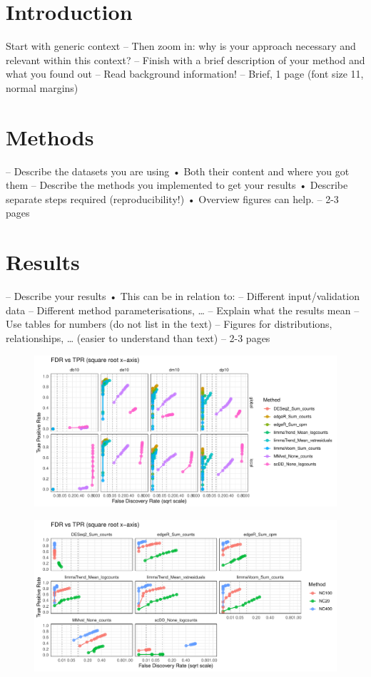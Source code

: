 \documentclass[a4paper, 11pt, twocolumn]{article}
\begin{document}
\twocolumn
\section{Introduction}

Start with generic context
– Then zoom in: why is your approach necessary
and relevant within this context?
– Finish with a brief description of your method and
what you found out
– Read background information!
– Brief, 1 page (font size 11, normal margins)

\section{Methods}
– Describe the datasets you are using
• Both their content and where you got them
– Describe the methods you implemented to get
your results
• Describe separate steps required (reproducibility!)
• Overview figures can help.
– 2-3 pages
\section{Results}

– Describe your results
• This can be in relation to:
– Different input/validation data
– Different method parameterisations, …
– Explain what the results mean
– Use tables for numbers (do not list in the text)
– Figures for distributions, relationships, … (easier
to understand than text)
– 2-3 pages
\begin{figure}[!ht]
	\centering
	\includegraphics[width = \linewidth]{figs/fdrtpr_prop_method.pdf}
	\caption{
	}
	\label{fdrtpr_prop}
\end{figure}

\begin{figure}[!ht]
	\centering
	\includegraphics[width = \linewidth]{figs/fdrtpr_size_method.pdf}
	\caption{
	}
	\label{fdrtpr_size}
\end{figure}
\end{document}

